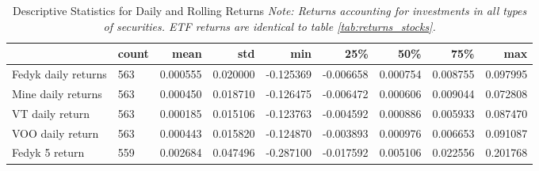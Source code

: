 \begin{appendices}
\begin{table}[ht]
\centering
\caption{Descriptive Statistics for Daily and Rolling Returns
\newline \footnotesize{\textit{Note: Returns accounting for investments in all types of securities. ETF returns are identical to table \ref{tab:returns_stocks}.}}}
\begin{adjustbox}{width=\textwidth}
    \begin{tabular}{@{}lllllllll@{}}
    \toprule
    \multicolumn{1}{r}{\textbf{}}       & \multicolumn{1}{r}{\textbf{count}} & \multicolumn{1}{r}{\textbf{mean}} & \multicolumn{1}{r}{\textbf{std}} & \multicolumn{1}{r}{\textbf{min}} & \multicolumn{1}{r}{\textbf{25\%}} & \multicolumn{1}{r}{\textbf{50\%}} & \multicolumn{1}{r}{\textbf{75\%}} & \multicolumn{1}{r}{\textbf{max}} \\ \midrule
    Fedyk daily returns           & 563                                & 0.000555                          & 0.020000                         & -0.125369                        & -0.006658                         & 0.000754                          & 0.008755                          & 0.097995                         \\
    Mine daily returns            & 563                                & 0.000450                          & 0.018710                         & -0.126475                        & -0.006472                         & 0.000606                          & 0.009044                          & 0.072808                         \\
    VT daily return             & 563                               & 0.000185                           & 0.015106                         & -0.123763                        & -0.004592                         & 0.000886                          & 0.005933                          & 0.087470                         \\
    VOO daily return            & 563                               & 0.000443                           & 0.015820                         & -0.124870                        & -0.003893                         & 0.000976                          & 0.006653                          & 0.091087                         \\
    Fedyk 5 return                & 559                                & 0.002684                          & 0.047496                         & -0.287100                        & -0.017592                         & 0.005106                          & 0.022556                          & 0.201768                         \\

\end{tabular}
\end{adjustbox}
\end{table}
\end{appendices}
